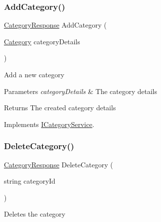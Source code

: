 \subsubsection{\texorpdfstring{Add\+Category()}{AddCategory()}}
{\footnotesize\ttfamily \hyperlink{classWildLifeTracker_1_1Response_1_1CategoryResponse}{Category\+Response} Add\+Category (\begin{DoxyParamCaption}\item[{\hyperlink{classWildLifeTracker_1_1Models_1_1Category}{Category}}]{category\+Details }\end{DoxyParamCaption})\hspace{0.3cm}{\ttfamily [inline]}}



Add a new category 


\begin{DoxyParams}{Parameters}
{\em category\+Details} & The category details\\
\hline
\end{DoxyParams}
\begin{DoxyReturn}{Returns}
The created category details
\end{DoxyReturn}


Implements \hyperlink{interfaceWildLifeTracker_1_1ICategoryService_ab22f6cdfb39adc2607dc86cb100889fc}{I\+Category\+Service}.

\mbox{\label{classWildLifeTracker_1_1CategoryService_a6479e2a6945b14d40e8c57642e9d2665}} 
\subsubsection{\texorpdfstring{Delete\+Category()}{DeleteCategory()}}
{\footnotesize\ttfamily \hyperlink{classWildLifeTracker_1_1Response_1_1CategoryResponse}{Category\+Response} Delete\+Category (\begin{DoxyParamCaption}\item[{string}]{category\+Id }\end{DoxyParamCaption})\hspace{0.3cm}{\ttfamily [inline]}}



Deletes the category 


